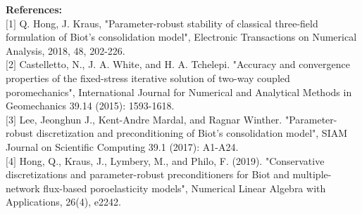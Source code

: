 \documentclass[a4paper,11pt]{scrartcl}
\begin{document}
\textbf{References:}\\

$[$1$]$ Q. Hong, J. Kraus, "Parameter-robust stability of classical three-field formulation of Biot's consolidation model", Electronic Transactions on Numerical Analysis, 2018, 48, 202-226. \\

$[$2$]$ Castelletto, N., J. A. White, and H. A. Tchelepi. "Accuracy and convergence properties of the fixed-stress iterative solution of two-way coupled poromechanics", International Journal for Numerical and Analytical Methods in Geomechanics 39.14 (2015): 1593-1618. \\

$[$3$]$ Lee, Jeonghun J., Kent-Andre Mardal, and Ragnar Winther. "Parameter-robust discretization and preconditioning of Biot's consolidation model", SIAM Journal on Scientific Computing 39.1 (2017): A1-A24. \\

$[$4$]$ Hong, Q., Kraus, J., Lymbery, M., and Philo, F. (2019). "Conservative discretizations and parameter-robust preconditioners for Biot and multiple-network flux-based poroelasticity models", Numerical Linear Algebra with Applications, 26(4), e2242.
\end{document}
